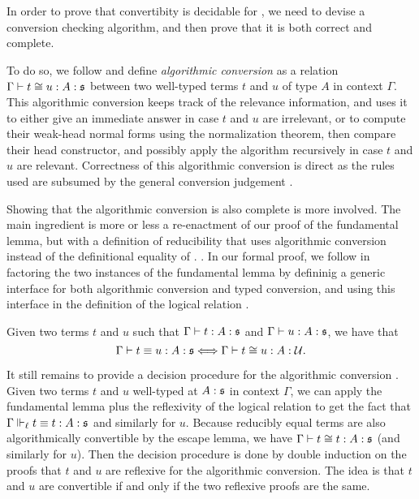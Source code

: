 In order to prove that convertibity is decidable for \SetoidCC, we need to 
devise a conversion checking algorithm, and then prove that it is both
correct and complete.

To do so, we follow  and define 
\emph{algorithmic conversion} as a relation 
$\Gamma \vdash t \cong u : A : \mathfrak{s}$ between two well-typed 
terms \( t \) and \( u \) of type \( A \) in context \( \Gamma \).
%
This algorithmic conversion keeps track of the relevance information,
and uses it to either give an immediate answer in case \( t \) and
\( u \) are irrelevant, or to compute their weak-head normal forms using
the normalization theorem, then compare their head constructor, and possibly 
apply the algorithm recursively in case \( t \) and \( u \) are relevant.
%
Correctness of this algorithmic conversion is direct as the rules used are
subsumed by the general conversion judgement .

Showing that the algorithmic conversion is also complete is more involved.
%
The main ingredient is more or less a re-enactment of our proof of the 
fundamental lemma, but with a definition of reducibility that
uses algorithmic conversion instead of the definitional equality of \SetoidCC.
.
%
In our formal proof, we follow  in factoring the two
instances of the fundamental lemma by defininig a generic interface for both
algorithmic conversion and typed conversion, and using this interface
in the definition of the logical relation .

\begin{theorem}
  \label{thm:algoconv}
    Given two terms $t$ and $u$ such that
    $\Gamma \vdash t : A : \mathfrak{s}$ and
    $\Gamma \vdash u : A : \mathfrak{s}$, we have that
    $$ \Gamma \vdash t \equiv u : A : \mathfrak{s} \Longleftrightarrow\Gamma \vdash t \cong u : A : \mathcal{U}{}.$$
\end{theorem}

It still remains to provide a decision procedure for the algorithmic
conversion .
%
Given two terms $t$ and $u$ well-typed at $A : \mathfrak{s}$ in context
$\Gamma$, we can apply the fundamental lemma plus the reflexivity of
the logical relation to get the fact that $\Gamma \Vdash_{\ell} t \equiv t : A : \mathfrak{s}$
and similarly for $u$.
%
Because reducibly equal terms are also algorithmically convertible by the escape lemma, we
have $\Gamma \vdash t \cong t : A : \mathfrak{s}$ (and similarly for $u$).
%
Then the decision procedure is done by double induction on the proofs
that $t$ and $u$ are reflexive for the algorithmic conversion.
%
The idea is that $t$ and $u$ are convertible if and only if the two reflexive proofs are the same.

